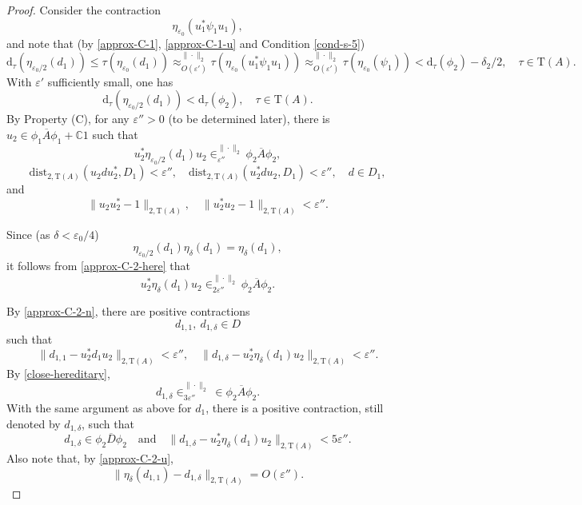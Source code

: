 \documentclass[12pt, oneside, psamsfonts]{amsart}
\theoremstyle{definition}
\theoremstyle{remark}
\numberwithin{equation}{section}
\newcommand{\norm}[1]{\| #1\|}
\newcommand{\Comp}{\mathbb C}
\newcommand{\eps}{\varepsilon}
\newcommand{\tr}{\mathrm{T}}
\begin{document}
\begin{proof}
Consider  the contraction
$$\eta_{\eps_0}(u^*_1\psi_1 u_1),$$
and note that (by \eqref{approx-C-1}, \eqref{approx-C-1-u} and Condition \eqref{cond-s-5})
$$ \mathrm{d}_\tau( \eta_{\eps_0/2}(d_1) ) \leq \tau(\eta_{\eps_0}(d_1))  \approx_{O(\eps')}^{\norm{\cdot}_2}  \tau( \eta_{\eps_0}(u^*_1\psi_1 u_1) ) \approx_{O(\eps')}^{\norm{\cdot}_2} \tau( \eta_{\eps_0}(\psi_1) ) < \mathrm{d}_\tau(\phi_2) - \delta_2/2,\quad \tau \in \tr(A).$$
With $\eps'$ sufficiently small, one has 
$$\mathrm{d}_\tau(\eta_{\eps_0/2}(d_1)) < \mathrm{d}_\tau(\phi_2),\quad \tau \in \tr(A).$$ 
By Property (C), for any $\eps''>0$ (to be determined later), there is $u_2 \in \overline{\phi_1 A \phi_1}+\Comp 1$ such that 
\begin{equation}\label{approx-C-2-here}
u^*_2 \eta_{\eps_0/2}(d_1) u_2 \in^{\norm{\cdot}_2}_{\eps''} \overline{\phi_2 A \phi_2},
\end{equation}
\begin{equation}\label{approx-C-2-n}
\mathrm{dist}_{2, \tr(A)}(u_2 d u^*_2, D_1) < \eps'', \quad \mathrm{dist}_{2, \tr(A)}(u_2^*du_2, D_1) < \eps'',\quad d \in D_1,
\end{equation}
and
\begin{equation}\label{approx-C-2-u}
\norm{u_2u_2^* - 1}_{2, \tr(A)},\quad  \norm{u_2^*u_2 - 1}_{2, \tr(A)} < \eps''.
\end{equation}


Since (as $\delta < \eps_0/4$)
$$\eta_{\eps_0/2}(d_1) \eta_\delta(d_1) = \eta_\delta(d_1),$$
it follows from \eqref{approx-C-2-here} that
\begin{equation}\label{close-hereditary}
u_2^* \eta_\delta(d_1) u_2 \in^{\norm{\cdot}_2}_{2\eps''} \overline{\phi_2 A \phi_2}. 
\end{equation}

By \eqref{approx-C-2-n}, there are positive contractions $$ d_{1, 1},\  d_{1, \delta} \in  D $$ such that
\begin{equation}\label{pert-C-step-2}
 \norm{d_{1, 1} - u_2^* d_1 u_2}_{2, \tr(A)} < \eps'',\quad  \norm{d_{1, \delta} - u_2^*\eta_{\delta}(d_1)u_2}_{2, \tr(A)} < \eps''. 
\end{equation}  
 By \eqref{close-hereditary}, $$d_{1, \delta} \in_{3\eps''}^{\norm{\cdot}_2} \in \overline{\phi_2A\phi_2}.$$
 With the same argument as above for $d_1$, there is a positive contraction, still denoted by $ d_{1, \delta}$, such that 
 \begin{equation}\label{u-2-2-approx-C-1}
 d_{1, \delta} \in \overline{\phi_2 D \phi_2}\quad \mathrm{and}\quad \norm{d_{1, \delta} - u_2^*\eta_{\delta}(d_1)u_2}_{2, \tr(A)} < 5\eps''.
 \end{equation}
Also note that, by \eqref{approx-C-2-u}, $$ \norm{ \eta_\delta(d_{1, 1}) - d_{1, \delta} }_{2, \tr(A)} = O(\eps''). $$


\end{proof}
\end{document}
